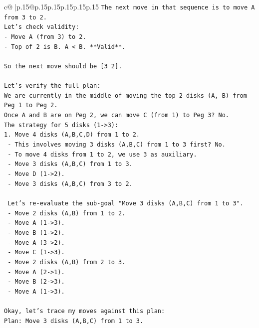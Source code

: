\documentclass{article}
\begin{document}
{\begin{supertabular}{c@{$\;$}|p{.15\linewidth}@{}p{.15\linewidth}p{.15\linewidth}p{.15\linewidth}p{.15\linewidth}p{.15\linewidth}}
{{{\texttt{The next move in that sequence is to move A from 3 to 2.} \\
\texttt{Let's check validity:} \\
\texttt{{-} Move A (from 3) to 2.} \\
\texttt{{-} Top of 2 is B. A < B. **Valid**.} \\
\\ 
\texttt{So the next move should be {[}3 2{]}.} \\
\\ 
\texttt{Let's verify the full plan:} \\
\texttt{We are currently in the middle of moving the top 2 disks (A, B) from Peg 1 to Peg 2.} \\
\texttt{Once A and B are on Peg 2, we can move C (from 1) to Peg 3? No.} \\
\texttt{The strategy for 5 disks (1{-}>3):} \\
\texttt{1. Move 4 disks (A,B,C,D) from 1 to 2.} \\
\texttt{   {-} This involves moving 3 disks (A,B,C) from 1 to 3 first? No.} \\
\texttt{   {-} To move 4 disks from 1 to 2, we use 3 as auxiliary.} \\
\texttt{     {-} Move 3 disks (A,B,C) from 1 to 3.} \\
\texttt{     {-} Move D (1{-}>2).} \\
\texttt{     {-} Move 3 disks (A,B,C) from 3 to 2.} \\
\\ 
\texttt{   Let's re{-}evaluate the sub{-}goal "Move 3 disks (A,B,C) from 1 to 3".} \\
\texttt{   {-} Move 2 disks (A,B) from 1 to 2.} \\
\texttt{     {-} Move A (1{-}>3).} \\
\texttt{     {-} Move B (1{-}>2).} \\
\texttt{     {-} Move A (3{-}>2).} \\
\texttt{   {-} Move C (1{-}>3).} \\
\texttt{   {-} Move 2 disks (A,B) from 2 to 3.} \\
\texttt{     {-} Move A (2{-}>1).} \\
\texttt{     {-} Move B (2{-}>3).} \\
\texttt{     {-} Move A (1{-}>3).} \\
\\ 
\texttt{Okay, let's trace my moves against this plan:} \\
\texttt{Plan: Move 3 disks (A,B,C) from 1 to 3.} \\
}}}
\end{supertabular}}
\end{document}
